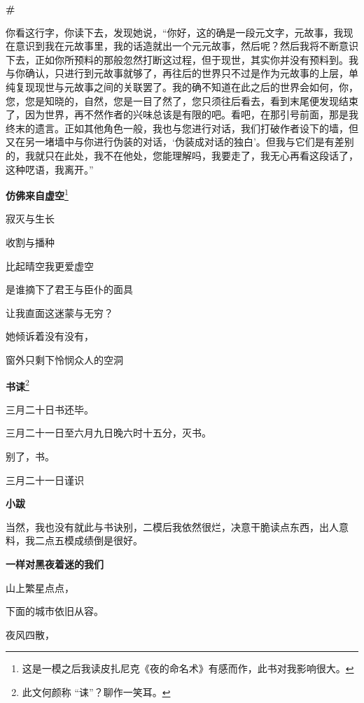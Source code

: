 \documentclass{ctexbook}
\begin{document}
\newpage
\textbf{\#}


\mbox


    你看这行字，你读下去，发现她说，“你好，这的确是一段元文字，元故事，我现在意识到我在元故事里，我的话造就出一个元元故事，然后呢？然后我将不断意识下去，正如你所预料的那般忽然打断这过程，但于现世，其实你并没有预料到。我与你确认，只进行到元故事就够了，再往后的世界只不过是作为元故事的上层，单纯复现现世与元故事之间的关联罢了。我的确不知道在此之后的世界会如何，你，您，您是知晓的，自然，您是一目了然了，您只须往后看去，看到末尾便发现结束了，因为世界，再不然作者的兴味总该是有限的吧。看吧，在那引号前面，那是我终末的遗言。正如其他角色一般，我也与您进行对话，我们打破作者设下的墙，但又在另一堵墙中与你进行伪装的对话，‘伪装成对话的独白’。但我与它们是有差别的，我就只在此处，我不在他处，您能理解吗，我要走了，我无心再看这段话了，这种呓语，我离开。”

\newpage
\textbf{仿佛来自虚空}\footnote{\normalsize 这是一模之后我读皮扎尼克《夜的命名术》有感而作，此书对我影响很大。}


\mbox


    寂灭与生长
    
    收割与播种
    
    比起晴空我更爱虚空
    
    是谁摘下了君王与臣仆的面具
    
    让我直面这迷蒙与无穷？
    
    她倾诉着没有没有，
    
    窗外只剩下怜悯众人的空洞

\newpage
\textbf{书诔}\footnote{\normalsize 此文何颜称 “诔”？聊作一笑耳。}


\mbox


    三月二十日书还毕。

    三月二十一日至六月九日晚六时十五分，灭书。

    别了，书。

    {\hfill 三月二十一日谨识}


\mbox


    {\normalsize \textbf{小跋}}

    {\normalsize 当然，我也没有就此与书诀别，二模后我依然很烂，决意干脆读点东西，出人意料，我二点五模成绩倒是很好。}

\newpage
\textbf{一样对黑夜着迷的我们}


\mbox


    山上繁星点点，

    下面的城市依旧从容。

    夜风四散，
\end{document}
